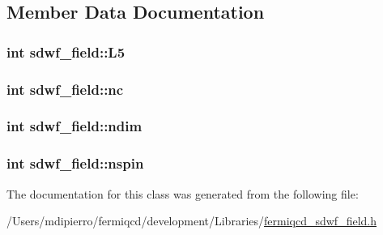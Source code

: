 \subsection{Member Data Documentation}
\hypertarget{classsdwf__field_a19bd0e3027574c1204f8aa3f6635d1df}{
\subsubsection[{L5}]{\setlength{\rightskip}{0pt plus 5cm}int {\bf sdwf\_\-field::L5}}}
\label{classsdwf__field_a19bd0e3027574c1204f8aa3f6635d1df}
\hypertarget{classsdwf__field_a957d5e1caa928243ec4224cf1e2861f1}{
\subsubsection[{nc}]{\setlength{\rightskip}{0pt plus 5cm}int {\bf sdwf\_\-field::nc}}}
\label{classsdwf__field_a957d5e1caa928243ec4224cf1e2861f1}
\hypertarget{classsdwf__field_a5a861ccb2b42b333b5d67e3b501e8533}{
\subsubsection[{ndim}]{\setlength{\rightskip}{0pt plus 5cm}int {\bf sdwf\_\-field::ndim}}}
\label{classsdwf__field_a5a861ccb2b42b333b5d67e3b501e8533}
\hypertarget{classsdwf__field_a6269e653489fd6ee9340da498187b132}{
\subsubsection[{nspin}]{\setlength{\rightskip}{0pt plus 5cm}int {\bf sdwf\_\-field::nspin}}}
\label{classsdwf__field_a6269e653489fd6ee9340da498187b132}


The documentation for this class was generated from the following file:\begin{DoxyCompactItemize}
\item 
/Users/mdipierro/fermiqcd/development/Libraries/\hyperlink{fermiqcd__sdwf__field_8h}{fermiqcd\_\-sdwf\_\-field.h}\end{DoxyCompactItemize}
